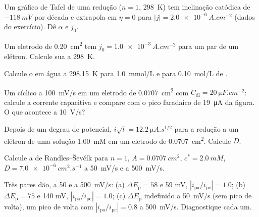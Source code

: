 \begin{exercise}[$\star$]\label{exo:b3:electrode-kinetics:1}
Um gráfico de Tafel de uma redução ($n = 1$, \qty{298}{K}) tem inclinação catódica de $-\qty{118}{mV}$
por década e extrapola em $\eta = 0$ para $|j| = \qty{2.0e-6}{A.cm^{-2}}$ (dados do exercício).
Dê $\alpha$ e $j_0$.
\end{exercise}

\begin{exercise}[$\star$]\label{exo:b3:electrode-kinetics:2}
Um eletrodo de \qty{0.20}{cm^2} tem $j_0 = \qty{1.0e-3}{A.cm^{-2}}$ para um par de um elétron.
Calcule sua  a \qty{298}{K}.
\end{exercise}

\begin{exercise}[$\star$]\label{exo:b3:electrode-kinetics:3}
Calcule o  em água a \qty{298.15}{K} para \qty{1.0}{mmol/L} e para \qty{0.10}{mol/L}
de .
\end{exercise}

\begin{exercise}[$\star$]\label{exo:b3:electrode-kinetics:4}
Um  cíclico a \qty{100}{mV/s} em um eletrodo de \qty{0.0707}{cm^2} com $C_{\mathrm{dl}} =
\qty{20}{\micro F.cm^{-2}}$: calcule a corrente capacitiva e compare com o pico faradaico de
\qty{19}{\micro A} da figura. O que acontece a \qty{10}{V/s}?
\end{exercise}

\begin{exercise}[$\star\star$]\label{exo:b3:electrode-kinetics:5}
Depois de um degrau de potencial, $i\sqrt t = \qty{12.2}{\micro A.s^{1/2}}$ para a redução a um elétron de uma
solução \qty{1.00}{mM} em um eletrodo de \qty{0.0707}{cm^2}. Calcule $D$.
\end{exercise}

\begin{exercise}[$\star\star$]\label{exo:b3:electrode-kinetics:6}
Calcule a  de Randles--Ševčík para $n = 1$, $A = \qty{0.0707}{cm^2}$, $c^* = \qty{2.0}{mM}$,
$D = \qty{7.0e-6}{cm^2.s^{-1}}$ a \qty{50}{mV/s} e a \qty{500}{mV/s}.
\end{exercise}

\begin{exercise}[$\star\star$]\label{exo:b3:electrode-kinetics:7}
Três pares dão, a 50 e a \qty{500}{mV/s}: (a) $\Delta E_{\mathrm p} = 58$ e 59 mV, $|i_{\mathrm{pa}}/i_{\mathrm{pc}}| = 1.0$;
(b) $\Delta E_{\mathrm p} = 75$ e 140 mV, $|i_{\mathrm{pa}}/i_{\mathrm{pc}}| = 1.0$; (c) $\Delta E_{\mathrm p}$ indefinido a \qty{50}{mV/s} (sem
pico de volta), um pico de volta com $|i_{\mathrm{pa}}/i_{\mathrm{pc}}| = 0.8$ a \qty{500}{mV/s}. Diagnostique cada um.
\end{exercise}

